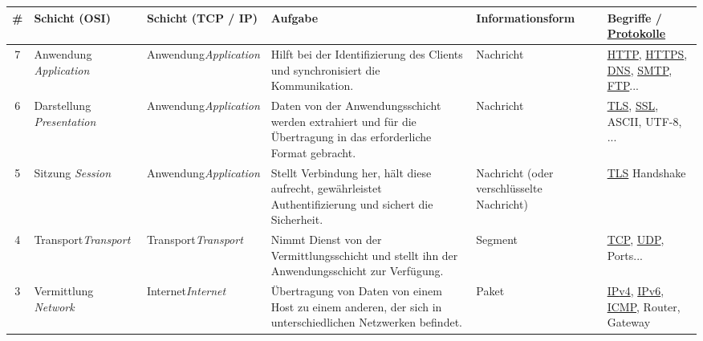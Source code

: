 \begin{tabular}{c|m{2.6cm}||m{2cm}||m{4.6cm}|m{2.5cm}|m{2cm}}
		\textbf{\#}              & \textbf{Schicht (\acrshort{OSI})}                     & \textbf{Schicht \newline (\acrshort{TCP} / \acrshort{IP})}  & \textbf{Aufgabe}                                                                                                & \textbf{Informations\-form}               & \textbf{Begriffe / \newline \underline{Protokolle}}   \\ \midrule\midrule
		\rowcolor{yellow!10}7    & Anwendung \newline \textit{Application}    & Anwendung\newline\textit{Application} & Hilft bei der Identifizierung des Clients und synchronisiert die Kommunikation.                                 & Nachricht                                 & \underline{\acrshort{HTTP}}, \underline{\acrshort{HTTPS}}, \underline{\acrshort{DNS}}, \underline{\acrshort{SMTP}}, \underline{\acrshort{FTP}}...        \\\midrule
		\rowcolor{yellow!20}6    & Darstellung \newline \textit{Presentation} & Anwendung\newline\textit{Application} & Daten von der Anwendungsschicht werden extrahiert und für die Übertragung in das erforderliche Format gebracht. & Nachricht                                 & \underline{\acrshort{TLS}}, \underline{\acrshort{SSL}}, \acrshort{ASCII}, \acrshort{UTF-8}, ...      \\\midrule
		\rowcolor{yellow!30}5    & Sitzung \newline \textit{Session}          & Anwendung\newline\textit{Application} & Stellt Verbindung her, hält diese aufrecht, gewährleistet Authentifizierung und sichert die Sicherheit.         & Nachricht (oder verschlüsselte Nachricht) & \underline{\acrshort{TLS}} Handshake           \\\midrule
		\rowcolor{orange!20}4    & Transport\newline \textit{Transport}       & Transport\newline\textit{Transport}   & Nimmt Dienst von der Vermittlungsschicht und stellt ihn der Anwendungsschicht zur Verfügung.                    & Segment                                   & \underline{\acrshort{TCP}}, \underline{\acrshort{UDP}}, Ports... \\\midrule
		\rowcolor{RoyalBlue!20}3 & Vermittlung \newline \textit{Network}      & Internet\newline\textit{Internet}     & Übertragung von Daten von einem Host zu einem anderen, der sich in unterschiedlichen Netzwerken befindet.       & Paket                                     & \underline{\acrshort{IP}v4}, \underline{\acrshort{IP}v6}, \underline{\acrshort{ICMP}}, Router, Gateway   \\\midrule

\end{tabular}
